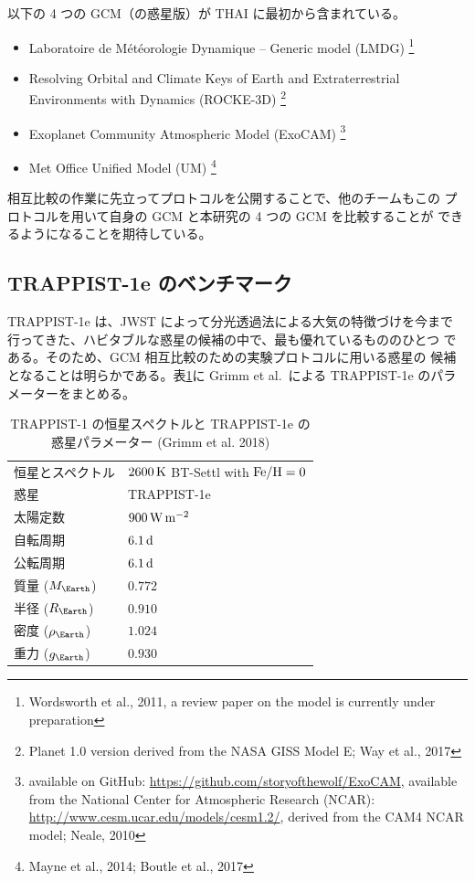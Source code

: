 \documentclass{dennou777}
\begin{document}
以下の 4 つの GCM（の惑星版）が THAI に最初から含まれている。
\begin{itemize}
	\item Laboratoire de Météorologie Dynamique -- Generic model (LMDG)%
		\footnote{Wordsworth et al., 2011, a review paper on the model
		is currently under preparation}
	\item Resolving Orbital and Climate Keys of Earth and
		Extraterrestrial Environments with Dynamics (ROCKE-3D)%
		\footnote{Planet 1.0 version derived from the NASA GISS Model E;
		Way et al., 2017}
	\item Exoplanet Community Atmospheric Model (ExoCAM)
		\footnote{available on GitHub:
		\url{https://github.com/storyofthewolf/ExoCAM},
		available from the National Center for Atmospheric Research (NCAR):
		\url{http://www.cesm.ucar.edu/models/cesm1.2/},
		derived from the CAM4 NCAR model; Neale, 2010}
	\item Met Office Unified Model (UM)
		\footnote{Mayne et al., 2014; Boutle et al., 2017}
\end{itemize}

相互比較の作業に先立ってプロトコルを公開することで、他のチームもこの
プロトコルを用いて自身の GCM と本研究の 4 つの GCM を比較することが
できるようになることを期待している。

\subsection{TRAPPIST-1e のベンチマーク}\label{benchmark}

TRAPPIST-1e は、JWST によって分光透過法による大気の特徴づけを今まで
行ってきた、ハビタブルな惑星の候補の中で、最も優れているもののひとつ
である。そのため、GCM 相互比較のための実験プロトコルに用いる惑星の
候補となることは明らかである。表\ref{param}に Grimm et al.\ による
TRAPPIST-1e のパラメーターをまとめる。

\begin{table}[t]
	\caption{
		TRAPPIST-1 の恒星スペクトルと TRAPPIST-1e の惑星パラメーター
		(Grimm et al. 2018)
	}\label{param}
	\centering
	\begin{tabular}{ll}
		\hline
		恒星とスペクトル&\(2600\hmu{K}\) BT-Settl with \(\ce{Fe/H}=0\)\\
		惑星&TRAPPIST-1e\\
		太陽定数&\(900\hmu{W\,m^{-2}}\)\\
		自転周期&\(6.1\hmu{d}\)\\
		公転周期&\(6.1\hmu{d}\)\\
		質量 (\(M_\Earth\))&\(0.772\)\\
		半径 (\(R_\Earth\))&\(0.910\)\\
		密度 (\(\rho_\Earth\))&\(1.024\)\\
		重力 (\(g_\Earth\))&\(0.930\)\\
		\hline
	\end{tabular}
\end{table}
\end{document}
